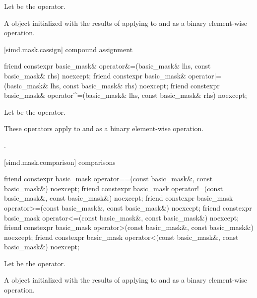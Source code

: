 \begin{itemdescr}
\pnum
Let  be the operator.

\pnum
\returns
A  object initialized with the results of applying
 to  and  as a binary element-wise
operation.
\end{itemdescr}

[simd.mask.cassign]{ compound assignment}

\begin{itemdecl}
friend constexpr basic_mask&
  operator&=(basic_mask& lhs, const basic_mask& rhs) noexcept;
friend constexpr basic_mask&
  operator|=(basic_mask& lhs, const basic_mask& rhs) noexcept;
friend constexpr basic_mask&
  operator^=(basic_mask& lhs, const basic_mask& rhs) noexcept;
\end{itemdecl}

\begin{itemdescr}
\pnum
Let  be the operator.

\pnum
\effects
These operators apply  to  and  as a
binary element-wise operation.

\pnum
\returns
{}.
\end{itemdescr}

[simd.mask.comparison]{ comparisons}

\begin{itemdecl}
friend constexpr basic_mask
  operator==(const basic_mask&, const basic_mask&) noexcept;
friend constexpr basic_mask
  operator!=(const basic_mask&, const basic_mask&) noexcept;
friend constexpr basic_mask
  operator>=(const basic_mask&, const basic_mask&) noexcept;
friend constexpr basic_mask
  operator<=(const basic_mask&, const basic_mask&) noexcept;
friend constexpr basic_mask
  operator>(const basic_mask&, const basic_mask&) noexcept;
friend constexpr basic_mask
  operator<(const basic_mask&, const basic_mask&) noexcept;
\end{itemdecl}

\begin{itemdescr}
\pnum
Let  be the operator.

\pnum
\returns
A  object initialized with the results of applying
 to  and  as a binary element-wise
operation.
\end{itemdescr}

